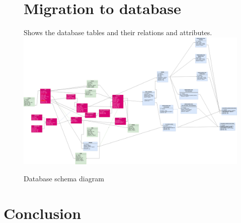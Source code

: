 \documentclass[]{uc2pfecaneva}
\begin{document}
    \begin{figure}
        \raggedright\section{Migration to database}

        \raggedright Shows the database tables and their relations and attributes.
        \linebreak
        \includegraphics[width=\textwidth]{images/DbSchema}
        \caption{Database schema diagram}
    \end{figure}
    \clearpage
    \raggedright\section{Conclusion}
\end{document}
